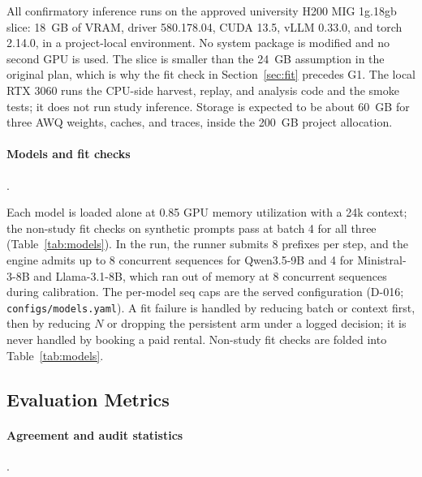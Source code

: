 \documentclass[a4paper,fleqn]{cas-sc}
\begin{document}
All confirmatory inference runs on the approved university H200 MIG 1g.18gb slice: 18~GB of
VRAM, driver 580.178.04, CUDA 13.5, vLLM 0.33.0, and torch 2.14.0, in a project-local
environment. No system package is modified and no second GPU is used. The slice is smaller than
the 24~GB assumption in the original plan, which is why the fit check in
Section~\ref{sec:fit} precedes G1. The local RTX 3060 runs the CPU-side harvest, replay, and
analysis code and the smoke tests; it does not run study inference. Storage is expected to be
about 60~GB for three AWQ weights, caches, and traces, inside the 200~GB project allocation.

\paragraph{Models and fit checks}.\ \label{sec:fit}

Each model is loaded alone at 0.85 GPU memory utilization with a 24k context; the non-study
fit checks on synthetic prompts pass at batch 4 for all three (Table~\ref{tab:models}). In the run, the runner submits 8
prefixes per step, and the engine admits up to 8 concurrent sequences for Qwen3.5-9B and 4 for
Ministral-3-8B and Llama-3.1-8B, which ran out of memory at 8 concurrent sequences during
calibration. The per-model seq caps are the served configuration (D-016;
\texttt{configs/models.yaml}). A fit failure is handled by reducing batch or context first, then
by reducing $N$ or dropping the persistent arm under a logged decision; it is never handled by
booking a paid rental. Non-study fit checks are folded into Table~\ref{tab:models}.
\subsection{Evaluation Metrics}
\label{sec:metrics}

\paragraph{Agreement and audit statistics}.\
\end{document}
